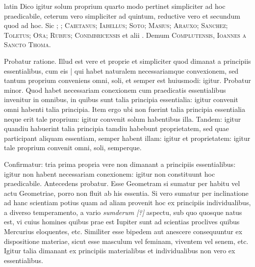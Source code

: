 \begin{otherlanguage*}{latin}
\pstart
  Dico igitur solum proprium quarto modo pertinet simpliciter ad hoc praedicabile, ceterum vero simpliciter ad quintum, reductive vero et secundum quod ad hoc. Sic ; ; \textsc{Caietanus}; \textsc{Iabellus}; \textsc{Soto}; \textsc{Masius}; \textsc{Arauxo}; \textsc{Sanchez}; \textsc{Toletus}; \textsc{Oña}; \textsc{Rubius}; \textsc{Conimbricensis}\index[persons]{} et alii . Demum \textsc{Complutensis}\index[persons]{}, \textsc{Ioannes a Sancto Thoma}\index[persons]{}. 
\pend

\pstart
  Probatur ratione. Illud est vere et proprie et simpliciter quod dimanat a principiis essentialibus, cum eis \textnormal{|} qui habet naturalem necessariamque convexionem, sed tantum proprium conveniens omni, soli, et semper est huiusmodi: igitur. Probatur minor. Quod habet necessariam conexionem cum praedicatis essentialibus invenitur in omnibus, in quibus sunt talia principia essentialia: igitur convenit omni habenti talia principia. Item ergo ubi non fuerint talia principia essentialia neque erit tale proprium: igitur convenit solum habentibus illa. Tandem: igitur quandiu habuerint talia principia tamdiu habebunt proprietatem, sed quae participant aliquam essentiam, semper habent illam: igitur et proprietatem: igitur tale proprium convenit omni, soli, semperque. 
\pend

\pstart
  Confirmatur: tria prima propria vere non dimanant a principiis essentialibus: igitur non habent necessariam conexionem: igitur non constituunt hoc praedicabile. Antecedens probatur. Esse Geometram si sumatur per habitu vel actu Geometriae, porro non fluit ab his essentia. Si vero sumatur per inclinatione ad hanc scientiam potius quam ad aliam provenit hoc ex principiis individualibus, a diverso temperamento, a vario \emph{sumderum [?]} aspectu, sub quo quosque natus est, vi cuius homines quibus prae est Iupiter sunt ad scientias proclives quibus Mercurius eloquentes, etc. Similiter esse bipedem aut anescere consequuntur ex dispositione materiae, sicut esse masculum vel feminam, viventem vel senem, etc. Igitur talia dimanant ex principiis materialibus et individualibus non vero ex essentialibus. 
\pend


\end{otherlanguage*}
